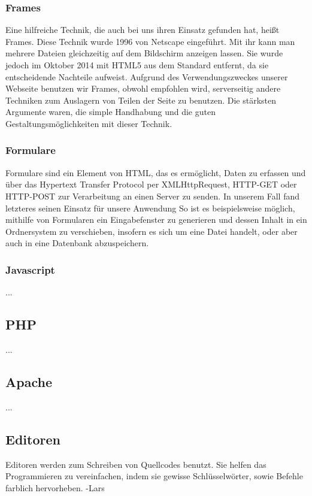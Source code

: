\documentclass[12pt,a4paper,bibliography=totocnumbered,listof=totocnumbered]{scrartcl}
\begin{document}
\subsubsection{Frames}
Eine hilfreiche Technik, die auch bei uns ihren Einsatz gefunden hat, heißt Frames. Diese Technik wurde 1996 von Netscape eingeführt. Mit ihr kann man mehrere Dateien gleichzeitig auf dem Bildschirm anzeigen lassen.\cite{HTML/Frames} Sie wurde jedoch im Oktober 2014 mit HTML5\cite{HTML5} aus dem Standard entfernt, da sie entscheidende Nachteile aufweist. Aufgrund des Verwendungszweckes unserer Webseite benutzen wir Frames, obwohl empfohlen wird, serverseitig andere Techniken zum Auslagern von Teilen der Seite zu benutzen.\cite{HTML/Frames} Die stärksten Argumente waren, die simple Handhabung und die guten Gestaltungsmöglichkeiten mit dieser Technik.

\subsubsection{Formulare}
Formulare sind ein Element von HTML, das es ermöglicht, Daten zu erfassen und über das Hypertext Transfer Protocol per XMLHttpRequest, HTTP-GET oder HTTP-POST zur Verarbeitung an einen Server zu senden. In unserem Fall fand letzteres seinen Einsatz für unsere Anwendung So ist es beispielsweise möglich, mithilfe von Formularen ein Eingabefenster zu generieren und dessen Inhalt in ein Ordnersystem zu verschieben, insofern es sich um eine Datei handelt, oder aber auch in eine Datenbank abzuspeichern.

\subsubsection{Javascript}
...

\subsection{PHP}
...

\subsection{Apache}
...

\subsection{Editoren}
Editoren werden zum Schreiben von Quellcodes benutzt.
Sie helfen das Programmieren zu vereinfachen, indem sie gewisse Schlüsselwörter, sowie Befehle farblich hervorheben. -Lars
\end{document}

